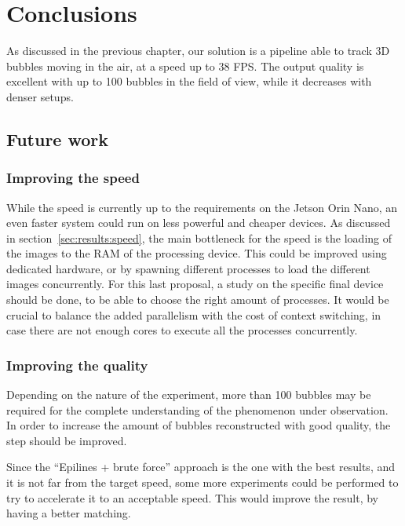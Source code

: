 \chapter{Conclusions}
\label{chap:conclusions}

As discussed in the previous chapter, our solution is a pipeline able to track 3D bubbles moving in the air, at a speed up to 38 FPS.
The output quality is excellent with up to 100 bubbles in the field of view, while it decreases with denser setups.

\section{Future work}

\subsection{Improving the speed}

While the speed is currently up to the requirements on the Jetson Orin Nano, an even faster system could run on less powerful and cheaper devices.
As discussed in section~\ref{sec:results:speed}, the main bottleneck for the speed is the loading of the images to the RAM of the processing device.
This could be improved using dedicated hardware, or by spawning different processes to load the different images concurrently.
For this last proposal, a study on the specific final device should be done, to be able to choose the right amount of processes.
It would be crucial to balance the added parallelism with the cost of context switching, in case there are not enough cores to execute all the processes concurrently.

\subsection{Improving the quality}

Depending on the nature of the experiment, more than 100 bubbles may be required for the complete understanding of the phenomenon under observation.
In order to increase the amount of bubbles reconstructed with good quality, the \match* step should be improved.

Since the ``Epilines + brute force'' approach is the one with the best results, and it is not far from the target speed, some more experiments could be performed to try to accelerate it to an acceptable speed.
This would improve the result, by having a better matching.

